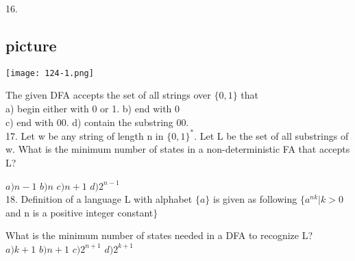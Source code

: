 \documentclass{article}
\begin{document}
16.
\begin{center}
\section{picture}
\texttt{[image: 124-1.png]}
\end{center}

\vspace*{0.2cm}

\hspace*{0.5cm} The given DFA accepts the set of all strings over $\{0, 1\}$ that\\

\vspace*{0.1cm}
\hspace{0.5cm} a) begin either with 0 or 1.    \hspace{1cm}  b) end with 0\\
\hspace{0.5cm} c) end with 00.                 \hspace{2cm}  d) contain the substring 00.\\

\vspace*{0.2cm}
17. Let w be any string of length n in $\{0, 1\}^{*}$. Let L be the set of all substrings of w. What is the minimum
number of states in a non-deterministic FA that accepts L?\\
\vspace*{0.1cm}

\hspace*{0.5cm} $a) n - 1$   \hspace*{0.5cm} $b) n$   \hspace*{0.5cm} $c) n + 1$     \hspace*{0.5cm} $d) 2^{n - 1}$ \\

\vspace*{0.2cm}
18. Definition of a language L with alphabet $\{a\}$ is given as following $\{a^{nk} | k > 0$ and n is a positive
integer constant$\}$ \\
\vspace*{0.1cm}

\hspace*{0.5cm} What is the minimum number of states needed in a DFA to recognize L?\\

\vspace*{0.1cm}
\hspace*{0.5cm} $a) k + 1$    \hspace*{0.5cm} $b) n + 1$     \hspace*{0.5cm} $c) 2^{n + 1}$    \hspace*{0.5cm} $d) 2^{k + 1}$\\
\end{document}
